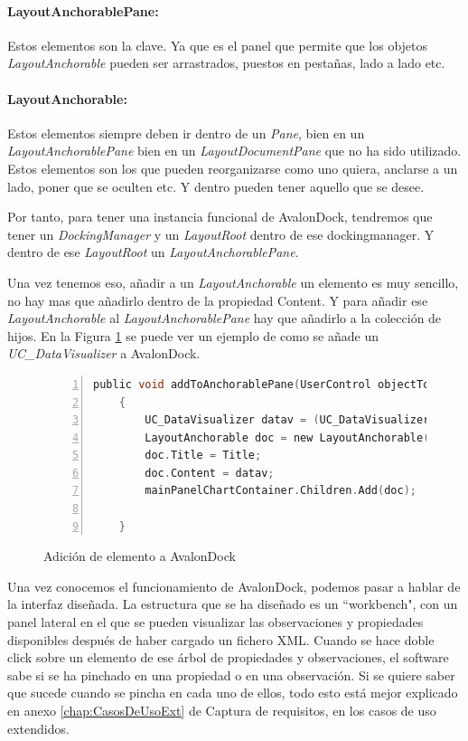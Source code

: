 \paragraph{LayoutAnchorablePane:} Estos elementos son la clave. Ya que es el panel que permite que los objetos
\emph{LayoutAnchorable} pueden ser arrastrados, puestos en pesta\~nas, lado a lado etc.

\paragraph{LayoutAnchorable:} Estos elementos siempre deben ir dentro de un \emph{Pane}, bien en un \emph{LayoutAnchorablePane}
bien en un \emph{LayoutDocumentPane} que no ha sido utilizado. Estos elementos 
son los que pueden reorganizarse como uno quiera,
anclarse a un lado, poner que se oculten etc. Y dentro pueden tener aquello que se desee.

Por tanto, para tener una instancia funcional de AvalonDock, tendremos que tener un \emph{DockingManager} y un
\emph{LayoutRoot} dentro de ese dockingmanager. Y dentro de ese \emph{LayoutRoot} un \emph{LayoutAnchorablePane}.

Una vez tenemos eso, a\~nadir a un \emph{LayoutAnchorable} un elemento es muy sencillo, no hay mas que a\~nadirlo dentro de la
propiedad Content. Y para a\~nadir ese \emph{LayoutAnchorable} al \emph{LayoutAnchorablePane} hay que a\~nadirlo a la colecci\'on
de hijos. En la Figura \ref{AnadirHijoAvalonDock} se puede ver un ejemplo de como se a\~nade un \emph{UC\_DataVisualizer} a 
AvalonDock.

\begin{figure}[h]
    \begin{lstlisting}[tabsize=2, language=C, numbers=left, showspaces=false, breaklines=true]
    public void addToAnchorablePane(UserControl objectToAdd, string Title)
    {
        UC_DataVisualizer datav = (UC_DataVisualizer)objectToAdd;
        LayoutAnchorable doc = new LayoutAnchorable();
        doc.Title = Title;
        doc.Content = datav;
        mainPanelChartContainer.Children.Add(doc);

    }
    \end{lstlisting}
    \caption[Adici\'on de elemento a AvalonDock]{Adici\'on de elemento a AvalonDock}
    \label{AnadirHijoAvalonDock}
\end{figure}

Una vez conocemos el funcionamiento de AvalonDock, podemos pasar a hablar de la interfaz dise\~nada.
La estructura que se ha dise\~nado es un ``workbench", con un panel lateral en el que se pueden visualizar las observaciones
y propiedades disponibles despu\'es de haber cargado un fichero XML. Cuando se hace doble click sobre un elemento
de ese \'arbol de propiedades y observaciones, el software sabe si se ha pinchado en una propiedad o en una observaci\'on.
Si se quiere saber que sucede cuando se pincha en cada uno de ellos, todo esto est\'a mejor explicado en anexo 
\ref{chap:CasosDeUsoExt} de
Captura de requisitos, en los casos de uso extendidos.

